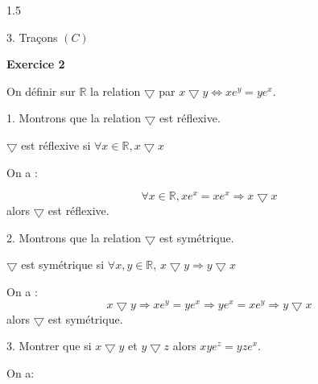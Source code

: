 \documentclass[12pt]{article}
\begin{document}
\begin{spacing}{1.5}
\begin{center}
{
}
\end{center} 


             
3. Traçons $(C)$


\medskip\textbf{Exercice 2}

On définir sur $\mathbb{R}$ la relation $\bigtriangledown$ par $x\bigtriangledown y\Longleftrightarrow xe^y=ye^x$.

1. Montrons que la relation $\bigtriangledown$ est réflexive.

$\bigtriangledown$ est réflexive si $\forall x\in \mathbb{R},x\bigtriangledown x$

On a :

\[
\forall x\in \mathbb{R}, xe^x=xe^x\Longrightarrow x\bigtriangledown x\] alors $\bigtriangledown$ est réflexive.


2. Montrons que la relation $\bigtriangledown$ est symétrique.

$\bigtriangledown$ est symétrique si $\forall x,y\in \mathbb{R}$, $x\bigtriangledown y\Rightarrow y\bigtriangledown x$

On a :
\[
x\bigtriangledown y\Rightarrow xe^y=ye^x\Rightarrow ye^x=xe^y\Rightarrow y\bigtriangledown x
\] alors $\bigtriangledown$ est symétrique.

3. Montrer que si $x\bigtriangledown y$ et $y\bigtriangledown z$ alors $x	ye^z = yze^x$.

On a:


\end{spacing}
\end{document}
